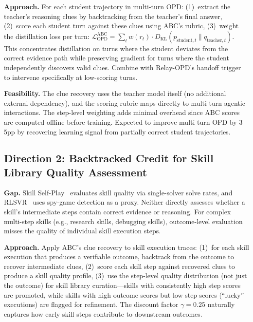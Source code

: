 \documentclass[11pt,a4paper]{article}
\begin{document}
\textbf{Approach.} For each student trajectory in multi-turn OPD: (1)~extract the teacher's reasoning clues by backtracking from the teacher's final answer, (2)~score each student turn against these clues using ABC's rubric, (3)~weight the distillation loss per turn: $\mathcal{L}_{\text{OPD}}^{\text{ABC}} = \sum_t w(r_t) \cdot D_{\text{KL}}(p_{\text{student},t} \| q_{\text{teacher},t})$. This concentrates distillation on turns where the student deviates from the correct evidence path while preserving gradient for turns where the student independently discovers valid clues. Combine with Relay-OPD's handoff trigger to intervene specifically at low-scoring turns.

\textbf{Feasibility.} The clue recovery uses the teacher model itself (no additional external dependency), and the scoring rubric maps directly to multi-turn agentic interactions. The step-level weighting adds minimal overhead since ABC scores are computed offline before training. Expected to improve multi-turn OPD by 3--5pp by recovering learning signal from partially correct student trajectories.

\subsection{Direction 2: Backtracked Credit for Skill Library Quality Assessment}

\textbf{Gap.} Skill Self-Play~\cite{skillselfplay2026} evaluates skill quality via single-solver solve rates, and RLSVR~\cite{rlsvr2026} uses spy-game detection as a proxy. Neither directly assesses whether a skill's intermediate steps contain correct evidence or reasoning. For complex multi-step skills (e.g., research skills, debugging skills), outcome-level evaluation misses the quality of individual skill execution steps.

\textbf{Approach.} Apply ABC's clue recovery to skill execution traces: (1)~for each skill execution that produces a verifiable outcome, backtrack from the outcome to recover intermediate clues, (2)~score each skill step against recovered clues to produce a skill quality profile, (3)~use the step-level quality distribution (not just the outcome) for skill library curation---skills with consistently high step scores are promoted, while skills with high outcome scores but low step scores (``lucky'' executions) are flagged for refinement. The discount factor $\gamma = 0.25$ naturally captures how early skill steps contribute to downstream outcomes.
\end{document}

